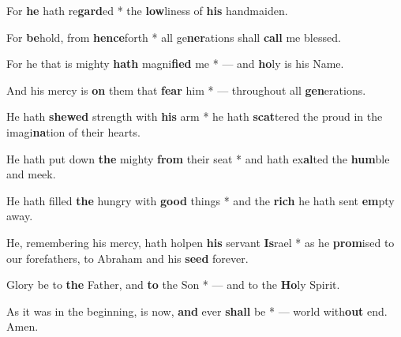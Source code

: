 \begin{multicols}{2}
	For \textbf{he} hath re\textbf{gard}ed * the \textbf{low}liness of \textbf{his} handmaiden.
	
	For \textbf{be}hold, from \textbf{hence}forth * all ge\textbf{ner}ations shall \textbf{call} me blessed.
	
	For he that is mighty \textbf{hath} magni\textbf{fied} me * --- and \textbf{ho}ly is his Name.
	
	And his mercy is \textbf{on} them that \textbf{fear} him * --- throughout all \textbf{gen}erations.
	
	He hath \textbf{shewed} strength with \textbf{his} arm * he hath \textbf{scat}tered the proud in the imagi\textbf{na}tion of their hearts.
	
	He hath put down \textbf{the} mighty \textbf{from} their seat * and hath ex\textbf{al}ted the \textbf{hum}ble and meek.
	
	He hath filled \textbf{the} hungry with \textbf{good} things * and the \textbf{rich} he hath sent \textbf{em}pty away.
	
	He, remembering his mercy, hath holpen \textbf{his} servant \textbf{Is}rael * as he \textbf{prom}ised to our forefathers, to Abraham and his \textbf{seed} forever.
	
	Glory be to \textbf{the} Father, and \textbf{to} the Son * --- and to the \textbf{Ho}ly Spirit.
	
	As it was in the beginning, is now, \textbf{and} ever \textbf{shall} be * --- world with\textbf{out} end. Amen.
\end{multicols}